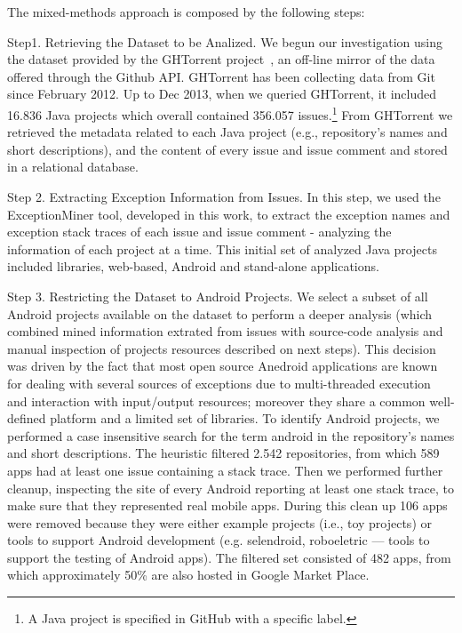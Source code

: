 \documentclass[conference]{IEEEtran}
\begin{document}

The mixed-methods approach is composed by the following steps:

Step1. Retrieving the Dataset to be Analized. We begun our investigation using the dataset 
provided by the GHTorrent project~\cite{Gousi13}, an off-line mirror of the data 
offered through the Github API.  GHTorrent has been collecting data from Git since 
February 2012. Up to Dec 2013, when we queried GHTorrent, it included 16.836 Java projects 
which overall contained 356.057 issues.\footnote {A Java project is specified in GitHub with a
specific label.} From GHTorrent we retrieved the metadata related to each Java project (e.g., 
repository's names and short descriptions), and the content of every issue and issue comment 
and stored in a relational database.

Step 2. Extracting Exception Information from Issues. In this step, we used the ExceptionMiner tool,
 developed in this work, to extract the exception names and exception stack traces of each
 issue and issue comment - analyzing the information of each project at a time. This initial 
set of analyzed Java projects included libraries, web-based, Android and stand-alone applications.  

Step 3. Restricting the Dataset to Android Projects. We select a subset of all Android 
projects available on the dataset to perform a deeper analysis (which combined mined
 information extrated from issues with source-code analysis and manual inspection 
of projects resources described on next steps). This decision was driven by the
fact that most open source Anedroid applications are known for dealing
with several sources of exceptions due to multi-threaded execution and
interaction with input/output resources; moreover they share a common
well-defined platform and a limited set of libraries.
To identify Android projects, we performed a case insensitive search for 
the term \textsf{android} in the repository's names and short descriptions.  The
heuristic filtered 2.542 repositories, from which 589 apps had at least one
issue containing a stack trace. Then we performed further cleanup, inspecting the site of every Android
reporting at least one stack trace, to make sure that they represented real
mobile apps. During this clean up 106 apps were removed because they were either
example projects (i.e., toy projects) or tools to support Android development
(e.g. \textsf{selendroid}, \textsf{roboeletric} --- tools to support the testing of Android apps).
The filtered set consisted of 482 apps, from which approximately 50\% are also
hosted in Google Market Place. 
\end{document}
